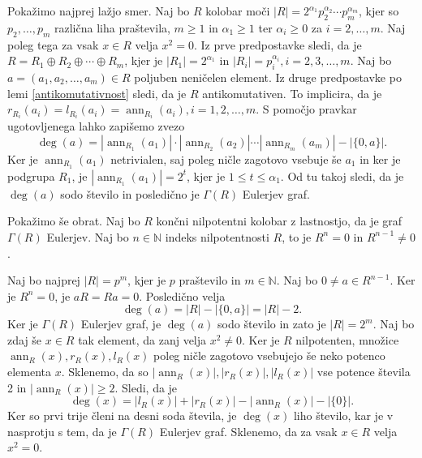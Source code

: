 \documentclass[a4paper, 12pt]{amsart}
\theoremstyle{definition} %
\theoremstyle{plain} %
\newcommand{\N}{\mathbb N}
\DeclareMathOperator{\ann}{ann}
\begin{document}
\proof
Pokažimo najprej lažjo smer. Naj bo $R$ kolobar moči $|R| = 2^{\alpha_1} p_2^{\alpha_2} \cdots  p_m^{\alpha_m}$, kjer so $p_2, \dots, p_m$ različna liha praštevila, $m\ge 1$ in $\alpha_1 \ge 1$ ter $\alpha_i \ge 0$ za $i=2,\dots,m$. Naj poleg tega za vsak $x\in R$ velja  $x^2 = 0$. Iz prve predpostavke sledi, da je $R = R_1 \oplus R_2 \oplus \cdots \oplus R_m$, kjer je $|R_1| = 2^{\alpha_1}$ in $|R_i| = p_i ^{\alpha_i}, i = 2,3,\dots,m$. Naj bo $a=(a_1,a_2,\dots,a_m)\in R$ poljuben neničelen element. Iz druge predpostavke po lemi \ref{antikomutativnost} sledi, da je $R$ antikomutativen. To implicira, da je $r_{R_i}(a_i) =l_{R_i}(a_i) = \ann_{R_i}(a_i), i=1,2,\dots,m$. S pomočjo pravkar ugotovljenega lahko zapišemo zvezo
$$
\deg(a) = |\ann_{R_1}(a_1)|\cdot|\ann_{R_2}(a_2)|\cdots|\ann_{R_m}(a_m)| - |\{0,a\}|.
$$
Ker je $\ann_{R_1}(a_1)$ netrivialen, saj poleg ničle zagotovo vsebuje še $a_1$ in ker je podgrupa $R_1$, je $|\ann_{R_1}(a_1)| = 2^{t}$, kjer je $1 \le t \le \alpha_1$. Od tu takoj sledi, da je $\deg(a)$ sodo število in posledično je $\Gamma(R)$ Eulerjev graf.

Pokažimo še obrat. Naj bo $R$ končni nilpotentni kolobar z lastnostjo, da je graf $\Gamma(R)$ Eulerjev. Naj bo $n\in \N$ indeks nilpotentnosti $R$, to je $R^n = 0$ in $R^{n-1}\neq 0$. 

Naj bo najprej $|R| = p^m$, kjer je $p$ praštevilo in $m\in \N$. Naj bo $0\neq a \in R^{n-1}$. Ker je $R^n = 0$, je $aR = Ra = 0$. Posledično velja 
$$
\deg(a)  = |R| -|\{0,a\}| = |R| - 2.
$$
Ker je $\Gamma(R)$ Eulerjev graf, je $\deg(a)$ sodo število in zato je $|R| = 2^m$. Naj bo zdaj še $x\in R$ tak element, da zanj velja $x^2 \neq 0$. Ker je $R$ nilpotenten, množice $\ann_R(x), r_R(x),l_R(x) $ poleg ničle zagotovo vsebujejo še neko potenco elementa $x$. Sklenemo, da so $| \ann_R(x)|, |r_R(x)|, |l_R(x)| $ vse potence števila 2 in $|\ann_R(x) | \ge 2$. Sledi, da je 
$$
\deg(x) = |l_R(x) | + |r_R(x)| - |\ann_R(x)| - |\{0\}|.
$$
Ker so prvi trije členi na desni soda števila, je $\deg(x)$ liho število, kar je v nasprotju s tem, da je $\Gamma(R)$ Eulerjev graf. Sklenemo, da za vsak $x\in R $ velja $x^2=0$.
\end{document}

